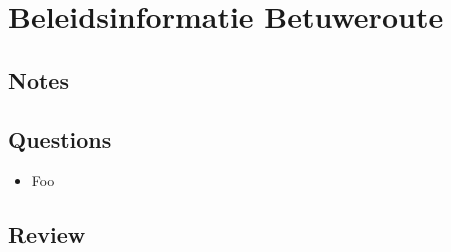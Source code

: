 \chapter{Beleidsinformatie Betuweroute \cite{beleidsinformatie-betuweroute}}
\section{Notes}

\section{Questions}
\begin{itemize}
  \item Foo
\end{itemize}

\section{Review}
